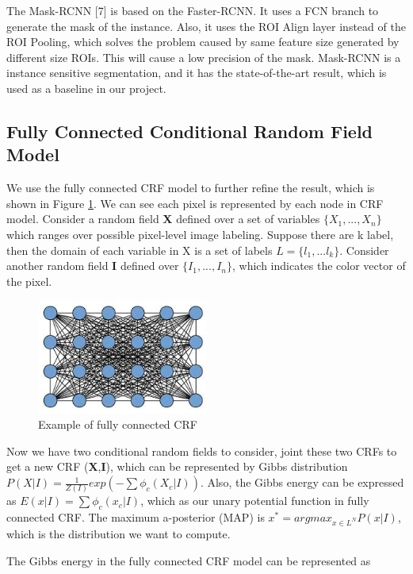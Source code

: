 \documentclass{article}
\begin{document}
The Mask-RCNN [7] is based on the Faster-RCNN. It uses a FCN branch to generate the mask of the instance. Also, it uses the ROI Align layer instead of the ROI Pooling, which solves the problem caused by same feature size generated by different size ROIs. This will cause a low precision of the mask. Mask-RCNN is a instance sensitive segmentation, and it has the state-of-the-art result, which is used as a baseline in our project.


\subsection{Fully Connected Conditional Random Field Model}

We use the fully connected CRF model to further refine the result, which is shown in Figure \ref{fully_CRF}. We can see each pixel is represented by each node in CRF model. Consider a random field \textbf{X} defined over a set of variables $\{X_{1}, ..., X_{n}\}$ which ranges over possible pixel-level image labeling. Suppose there are k label, then the domain of each variable in X is a set of labels $L=\{l_{1},...l_{k}\}$. Consider another random field \textbf{I} defined over $\{I_{1}, ..., I_{n}\}$, which indicates the color vector of the pixel. 

\begin{figure}
  \centering
  \includegraphics[width=0.5\textwidth]{denseCRF.jpeg}
  \caption{Example of fully connected CRF}
  \label{fully_CRF}
\end{figure}

Now we have two conditional random fields to consider, joint these two CRFs to get a new CRF (\textbf{X},\textbf{I}), which can be represented by Gibbs distribution $P(X|I)=\frac{1}{Z(I)}exp(-\sum\phi_{c}(X_{c}|I))$. Also, the Gibbs energy can be expressed as $E(x|I)=\sum\phi_{c}(x_{c}|I)$, which as our unary potential function in fully connected CRF. The maximum a-posterior (MAP) is $x^*=argmax_{x\in L^N}P(x|I)$, which is the distribution we want to compute.

The Gibbs energy in the fully connected CRF model can be represented as
\end{document}

